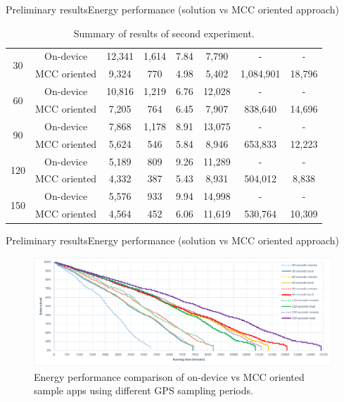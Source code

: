 \documentclass[9pt,xcolor={dvipsnames},handout]{beamer}
\begin{document}
\begin{frame}{Preliminary results}{Energy performance (solution vs MCC oriented approach)}
\begin{table}
{\begin{tabular}{@{}cccccccc@{}}
\multirow{2}{*}{30}  & On-device   &  12,341 & 1,614 & 7.84  & 7,790 & - & - \\
                          & MCC oriented &  9,324 &   770 & 4.98  & 5,402 & 1,084,901 & 18,796 \\
\cmidrule(l){2-8}
\multirow{2}{*}{60}  & On-device    & 10,816 & 1,219 & 6.76 & 12,028 & - & - \\
                          & MCC oriented &  7,205 &   764 & 6.45 &  7,907 & 838,640 & 14,696 \\
\cmidrule(l){2-8}
\multirow{2}{*}{90}  & On-device    & 7,868 & 1,178 & 8.91 & 13,075 & - & - \\
                          & MCC oriented & 5,624 &   546 & 5.84 &  8,946 & 653,833 & 12,223 \\
\cmidrule(l){2-8}
\multirow{2}{*}{120} & On-device    & 5,189 & 809 & 9.26 & 11,289 & - & - \\
                          & MCC oriented & 4,332 & 387 & 5.43 &  8,931 & 504,012 & 8,838 \\
\cmidrule(l){2-8}
\multirow{2}{*}{150} & On-device    & 5,576 & 933 & 9.94 & 14,998 & - & - \\
                          & MCC oriented & 4,564 & 452 & 6.06 & 11,619 & 530,764 & 10,309 \\
\bottomrule
\end{tabular}%
}
\caption{Summary of results of second experiment.}
\label{tbl:experiment-2}
\end{table}
\end{frame}

\begin{frame}{Preliminary results}{Energy performance (solution vs MCC oriented approach)}
\begin{figure}
  \centering
  \includegraphics[width=\columnwidth]{vectors/plot-energy-performance-r2}
  \caption{Energy performance comparison of on-device vs MCC oriented sample apps using different GPS sampling periods.}
  \label{fig:plot-energy-performance}
\end{figure}
\end{frame}
\end{document}
